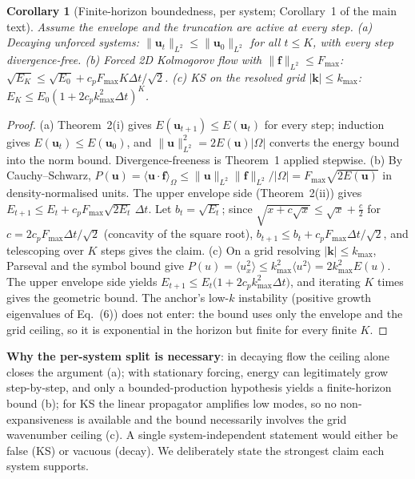 \documentclass[11pt,a4paper]{article}
\newtheorem{corollary}{Corollary}
\newcommand{\bu}{\bm{u}}
\newcommand{\Ex}{E}
\begin{document}
\begin{corollary}[Finite-horizon boundedness, per system; Corollary~1 of the main text]
Assume the envelope and the truncation are active at every step.
(a) Decaying unforced systems: $\|\bu_t\|_{L^2}\le\|\bu_0\|_{L^2}$ for all $t\le K$, with every step divergence-free.
(b) Forced 2D Kolmogorov flow with $\|\bm f\|_{L^2}\le F_{\max}$: $\sqrt{\Ex_K}\le\sqrt{\Ex_0}+c_pF_{\max}K\Delta t/\sqrt2$.
(c) KS on the resolved grid $|\bm k|\le k_{\max}$: $\Ex_K\le\Ex_0(1+2c_pk_{\max}^2\Delta t)^K$.
\end{corollary}

\begin{proof}
(a) Theorem~2(i) gives $\Ex(\bu_{t+1})\le\Ex(\bu_t)$ for every step; induction gives $\Ex(\bu_t)\le\Ex(\bu_0)$, and $\|\bu\|_{L^2}^2=2\Ex(\bu)|\Omega|$ converts the energy bound into the norm bound. Divergence-freeness is Theorem~1 applied stepwise.
(b) By Cauchy--Schwarz, $P(\bu)=\langle\bu\cdot\bm f\rangle_\Omega\le\|\bu\|_{L^2}\|\bm f\|_{L^2}/|\Omega| = F_{\max}\sqrt{2\Ex(\bu)}$ in density-normalised units. The upper envelope side (Theorem~2(ii)) gives $\Ex_{t+1}\le\Ex_t+c_pF_{\max}\sqrt{2\Ex_t}\,\Delta t$. Let $b_t=\sqrt{\Ex_t}$; since $\sqrt{x+c\sqrt{x}}\le\sqrt{x}+\tfrac{c}{2}$ for $c=2c_pF_{\max}\Delta t/\sqrt{2}$ (concavity of the square root), $b_{t+1}\le b_t+c_pF_{\max}\Delta t/\sqrt2$, and telescoping over $K$ steps gives the claim.
(c) On a grid resolving $|\bm k|\le k_{\max}$, Parseval and the symbol bound give $P(u)=\langle u_x^2\rangle\le k_{\max}^2\langle u^2\rangle=2k_{\max}^2\Ex(u)$. The upper envelope side yields $\Ex_{t+1}\le\Ex_t\big(1+2c_pk_{\max}^2\Delta t\big)$, and iterating $K$ times gives the geometric bound. The anchor's low-$k$ instability (positive growth eigenvalues of Eq.~(6)) does not enter: the bound uses only the envelope and the grid ceiling, so it is exponential in the horizon but finite for every finite $K$.
\end{proof}

\textbf{Why the per-system split is necessary}: in decaying flow the ceiling alone closes the argument (a); with stationary forcing, energy can legitimately grow step-by-step, and only a bounded-production hypothesis yields a finite-horizon bound (b); for KS the linear propagator amplifies low modes, so no non-expansiveness is available and the bound necessarily involves the grid wavenumber ceiling (c). A single system-independent statement would either be false (KS) or vacuous (decay). We deliberately state the strongest claim each system supports.
\end{document}
